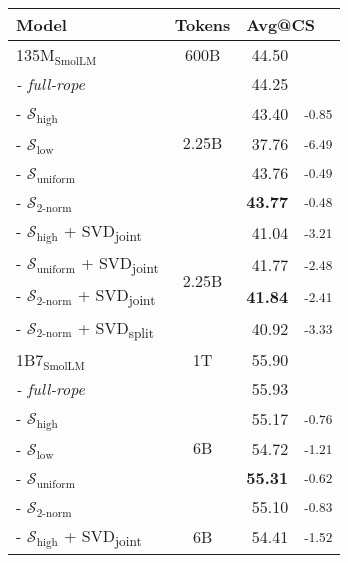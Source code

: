 \begin{table}[t]
\centering
\small
\begin{tabular}{lcr@{\hspace{2pt}}l}
  \toprule
  \textbf{Model} & \textbf{Tokens} & \multicolumn{2}{l}{\textbf{Avg@CS}} \\
  \midrule
  \rowcolor{gray!10}135M$_{\text{SmolLM}}$ & 600B & 44.50  \\
  \textit{- full-rope} & \multirow{5}{*}{2.25B}  & 44.25 \\
  - $\mathcal{S}_{\text{high}}$ &   & 43.40&\textsubscript{-0.85} \\
  - $\mathcal{S}_{\text{low}}$ &   & 37.76&\textsubscript{-6.49} \\
  - $\mathcal{S}_{\text{uniform}}$ &   & 43.76&\textsubscript{-0.49} \\
  - $\mathcal{S}_{\text{2-norm}}$ &   & \bf 43.77&\textsubscript{-0.48} \\
  \arrayrulecolor{gray!20}
  \hline
  - $\mathcal{S}_{\text{high}}$ + SVD\textsubscript{joint} &  \multirow{4}{*}{2.25B} & 41.04&\textsubscript{-3.21} \\
  - $\mathcal{S}_{\text{uniform}}$ + SVD\textsubscript{joint} &   & 41.77&\textsubscript{-2.48} \\
  - $\mathcal{S}_{\text{2-norm}}$ + SVD\textsubscript{joint} &   & \bf 41.84&\textsubscript{-2.41} \\
  - $\mathcal{S}_{\text{2-norm}}$ + SVD\textsubscript{split} & & 40.92 & \textsubscript{-3.33} \\
  \arrayrulecolor{black}
  \midrule
  \rowcolor{gray!10}1B7$_{\text{SmolLM}}$ & 1T & 55.90 \\
  \textit{- full-rope} & \multirow{5}{*}{6B}  & 55.93 \\
  - $\mathcal{S}_{\text{high}}$ &   & 55.17&\textsubscript{-0.76} \\
  - $\mathcal{S}_{\text{low}}$ &   & 54.72&\textsubscript{-1.21} \\
  - $\mathcal{S}_{\text{uniform}}$ &   & \bf 55.31&\textsubscript{-0.62} \\
  - $\mathcal{S}_{\text{2-norm}}$ &   & 55.10&\textsubscript{-0.83} \\
  \arrayrulecolor{gray!20}
  \hline
  - $\mathcal{S}_{\text{high}}$ + SVD\textsubscript{joint} & \multirow{4}{*}{6B}  & 54.41&\textsubscript{-1.52} \\

\end{tabular}
\end{table}
